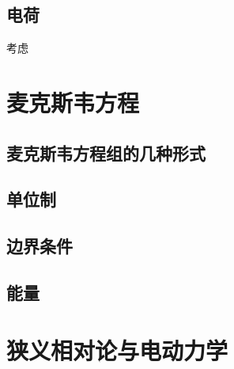 \documentclass[UTF8, a4paper]{ctexart}
\begin{document}
\subsection{电荷}

考虑

\section{麦克斯韦方程}

\subsection{麦克斯韦方程组的几种形式}

\subsection{单位制}

\subsection{边界条件}

\subsection{能量}

\section{狭义相对论与电动力学}
\end{document}
